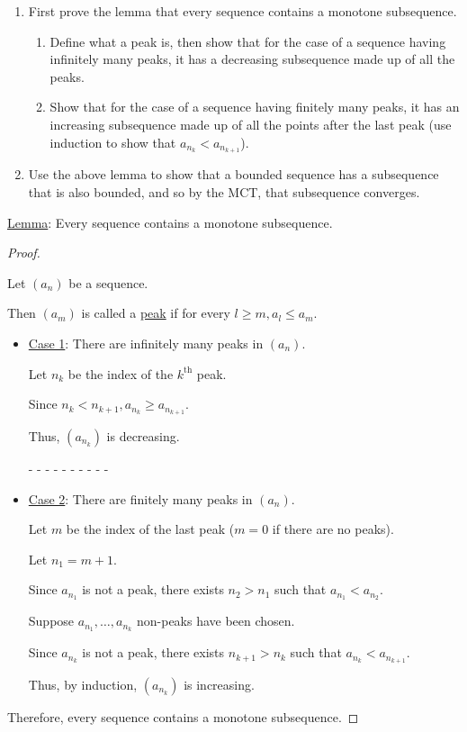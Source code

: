 \documentclass[12pt]{article}
\begin{document}
\begin{enumerate}
\item First prove the lemma that every sequence contains a monotone subsequence.
\begin{enumerate}
\item Define what a peak is, then show that for the case of a sequence having infinitely many peaks, it has a decreasing subsequence made up of all the peaks.

\item Show that for the case of a sequence having finitely many peaks, it has an increasing subsequence made up of all the points after the last peak (use induction to show that $a_{n_k} < a_{n_{k + 1}}$).
\end{enumerate}

\item Use the above lemma to show that a bounded sequence has a subsequence that is also bounded, and so by the MCT, that subsequence converges.
\end{enumerate}

\dotfill

\underline{Lemma}: Every sequence contains a monotone subsequence.
\begin{proof}
$ $

Let $(a_n)$ be a sequence.

Then $(a_m)$ is called a \underline{peak} if for every $l \ge m, a_l \le a_m$.

\begin{itemize}
\item \underline{Case 1}: There are infinitely many peaks in $(a_n)$.

Let $n_k$ be the index of the $k^{\text{th}}$ peak.

Since $n_k < n_{k + 1}, a_{n_k} \ge a_{n_{k + 1}}$.

Thus, $(a_{n_k})$ is decreasing.

- - - - - - - - - -

\item \underline{Case 2}: There are finitely many peaks in $(a_n)$.

Let $m$ be the index of the last peak ($m = 0$ if there are no peaks).

Let $n_1 = m + 1$.

Since $a_{n_1}$ is not a peak, there exists $n_2 > n_1$ such that $a_{n_1} < a_{n_2}$.

Suppose $a_{n_1}, \dots, a_{n_k}$ non-peaks have been chosen.

Since $a_{n_k}$ is not a peak, there exists $n_{k + 1} > n_k$ such that $a_{n_k} < a_{n_{k + 1}}$.

Thus, by induction, $(a_{n_k})$ is increasing.
\end{itemize}

Therefore, every sequence contains a monotone subsequence.
\end{proof}
\end{document}
